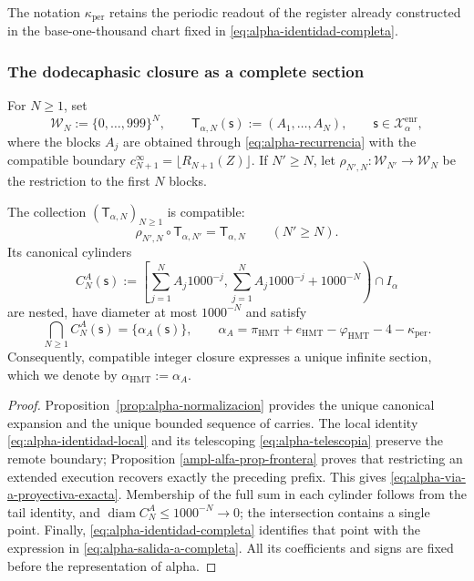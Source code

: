The notation \(\kappa_{\mathrm{per}}\) retains the periodic readout of the register already constructed in the base-one-thousand chart fixed in \eqref{eq:alpha-identidad-completa}.

\subsubsection{The dodecaphasic closure as a complete section}

For \(N\geq1\), set
\[
 \mathcal W_N:=\{0,\ldots,999\}^{N},
 \qquad
 \mathsf T_{\alpha,N}(\mathsf s):=(A_1,\ldots,A_N),
 \qquad \mathsf s\in\mathcal X_{\alpha}^{\mathrm{enr}},
\]
where the blocks \(A_j\) are obtained through
\eqref{eq:alpha-recurrencia} with the compatible boundary
\(c_{N+1}^{\infty}=\lfloor R_{N+1}(Z)\rfloor\). If \(N'\geq N\), let
\(\rho_{N',N}:\mathcal W_{N'}\to\mathcal W_N\) be the restriction to the
first \(N\) blocks.

\begin{theorem}
\label{thm:alpha-salida-dodecafasica-completa}
The collection \((\mathsf T_{\alpha,N})_{N\geq1}\) is compatible:
\begin{equation}
 \rho_{N',N}\circ\mathsf T_{\alpha,N'}
 =\mathsf T_{\alpha,N}
 \qquad(N'\geq N).
 \label{eq:alpha-via-a-proyectiva-exacta}
\end{equation}
Its canonical cylinders
\begin{equation}
 C_N^A(\mathsf s):=
 \left[
  \sum_{j=1}^{N}A_j1000^{-j},
  \sum_{j=1}^{N}A_j1000^{-j}+1000^{-N}
 \right)\cap I_\alpha
 \label{eq:alpha-cilindros-via-a-exactos}
\end{equation}
are nested, have diameter at most \(1000^{-N}\) and satisfy
\begin{equation}
 \bigcap_{N\geq1}C_N^A(\mathsf s)
 =\{\alpha_A(\mathsf s)\},
 \qquad
 \alpha_A
 =\pi_{\mathrm{HMT}}+e_{\mathrm{HMT}}-\varphi_{\mathrm{HMT}}
  -4-\kappa_{\mathrm{per}}.
 \label{eq:alpha-salida-a-completa}
\end{equation}
Consequently, compatible integer closure expresses a unique infinite section, which we
denote by \(\alpha_{\mathrm{HMT}}:=\alpha_A\).
\end{theorem}

\begin{proof}
Proposition~\ref{prop:alpha-normalizacion} provides the unique canonical
expansion and the unique bounded sequence of carries. The local identity
\eqref{eq:alpha-identidad-local} and its telescoping
\eqref{eq:alpha-telescopia} preserve the remote boundary; Proposition
\ref{ampl-alfa-prop-frontera} proves that restricting an extended execution
recovers exactly the preceding prefix. This gives
\eqref{eq:alpha-via-a-proyectiva-exacta}. Membership of the full sum
in each cylinder follows from the tail identity, and
\(\operatorname{diam}C_N^A\leq1000^{-N}\to0\); the intersection contains a
single point. Finally, \eqref{eq:alpha-identidad-completa} identifies that
point with the expression in \eqref{eq:alpha-salida-a-completa}. All its
coefficients and signs are fixed before the representation of alpha.
\end{proof}

